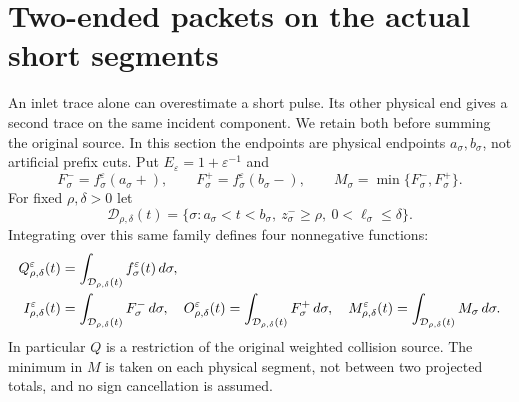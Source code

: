 \section{Two-ended packets on the actual short segments}
\label{sec:v95-packets}
An inlet trace alone can overestimate a short pulse. Its other physical
end gives a second trace on the same incident component. We retain both
before summing the original source. In this section the endpoints are
physical endpoints $a_\sigma,b_\sigma$, not artificial prefix cuts.
Put $E_\varepsilon=1+\varepsilon^{-1}$ and
\[
 F_\sigma^-=f_\sigma^\varepsilon(a_\sigma+),\qquad
 F_\sigma^+=f_\sigma^\varepsilon(b_\sigma-),\qquad
 M_\sigma=\min\{F_\sigma^-,F_\sigma^+\}.
\]
For fixed $\rho,\delta>0$ let
\[
 \mathcal D_{\rho,\delta}(t)
 =\{\sigma:a_\sigma<t<b_\sigma,\ z_\sigma^-\ge\rho,
                                      \ 0<\ell_\sigma\le\delta\}.
\]
Integrating over this same family defines four nonnegative functions:
\begin{align}
 Q_{\rho,\delta}^\varepsilon(t)&=\int_{\mathcal D_{\rho,\delta}(t)}
                                      f_\sigma^\varepsilon(t)\,d\sigma,\notag\\
 I_{\rho,\delta}^\varepsilon(t)&=\int_{\mathcal D_{\rho,\delta}(t)}F_\sigma^-\,d\sigma,
 \quad O_{\rho,\delta}^\varepsilon(t)=\int_{\mathcal D_{\rho,\delta}(t)}F_\sigma^+\,d\sigma,
 \quad M_{\rho,\delta}^\varepsilon(t)=\int_{\mathcal D_{\rho,\delta}(t)}M_\sigma\,d\sigma.
 \label{eq:v95-packets}
\end{align}
In particular $Q$ is a restriction of the original weighted collision
source. The minimum in $M$ is taken on each physical segment, not
between two projected totals, and no sign cancellation is assumed.


